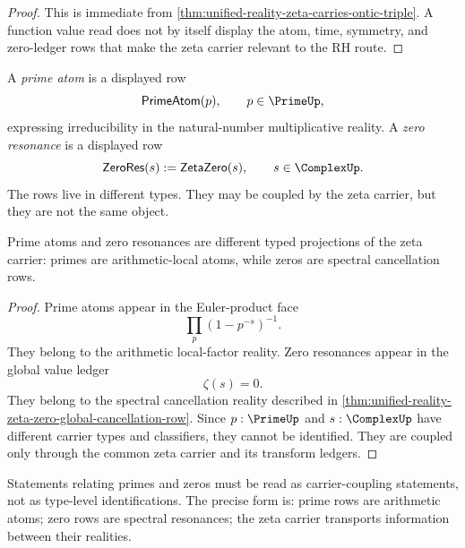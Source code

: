 \begin{proof}
This is immediate from
\autoref{thm:unified-reality-zeta-carries-ontic-triple}. A function
value read does not by itself display the atom, time, symmetry, and
zero-ledger rows that make the zeta carrier relevant to the RH route.
\end{proof}

\begin{definition}
\label{def:unified-reality-prime-atom-zero-resonance}
A \emph{prime atom} is a displayed row
$$
\mathsf{PrimeAtom}(p),
\qquad
p\in\PrimeUp,
$$
expressing irreducibility in the natural-number multiplicative reality.
A \emph{zero resonance} is a displayed row
$$
\mathsf{ZeroRes}(s):=\mathsf{ZetaZero}(s),
\qquad
s\in\ComplexUp.
$$
The rows live in different types. They may be coupled by the zeta
carrier, but they are not the same object.
\end{definition}

\begin{theorem}
\label{thm:unified-reality-prime-zero-dual-projections}
Prime atoms and zero resonances are different typed projections of the
zeta carrier: primes are arithmetic-local atoms, while zeros are
spectral cancellation rows.
\end{theorem}

\begin{proof}
Prime atoms appear in the Euler-product face
$$
\prod_p(1-p^{-s})^{-1}.
$$
They belong to the arithmetic local-factor reality. Zero resonances
appear in the global value ledger
$$
\zeta(s)=0.
$$
They belong to the spectral cancellation reality described in
\autoref{thm:unified-reality-zeta-zero-global-cancellation-row}. Since
$p:\PrimeUp$ and $s:\ComplexUp$ have different carrier types and
classifiers, they cannot be identified. They are coupled only through
the common zeta carrier and its transform ledgers.
\end{proof}

\begin{corollary}
\label{cor:unified-reality-prime-zero-language-projection-relative}
Statements relating primes and zeros must be read as carrier-coupling
statements, not as type-level identifications. The precise form is:
prime rows are arithmetic atoms; zero rows are spectral resonances; the
zeta carrier transports information between their realities.
\end{corollary}

